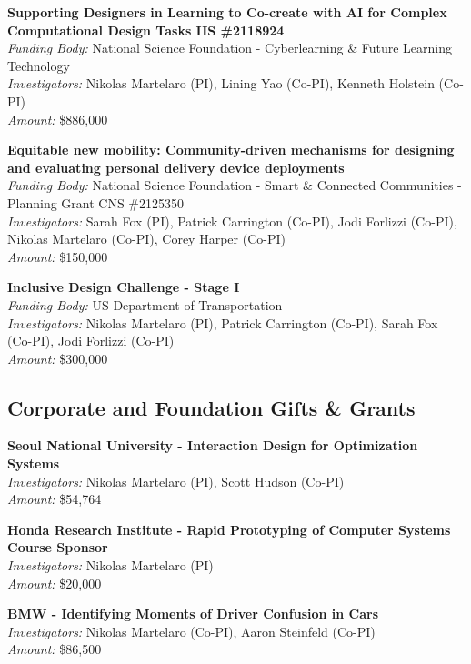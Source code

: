 \documentclass[11pt]{article} %
\begin{document}
\textbf{Supporting Designers in Learning to Co-create with AI for Complex Computational Design Tasks IIS \#2118924}\\
\textit{Funding Body:} National Science Foundation - Cyberlearning \& Future Learning Technology\\
\textit{Investigators:} Nikolas Martelaro (PI), Lining Yao (Co-PI), Kenneth Holstein (Co-PI)\\
\textit{Amount:} \$886,000
\medskip

\textbf{Equitable new mobility: Community-driven mechanisms for designing and evaluating personal delivery device deployments}\\
\textit{Funding Body:} National Science Foundation - Smart \& Connected Communities - Planning Grant CNS \#2125350\\
\textit{Investigators:} Sarah Fox (PI), Patrick  Carrington (Co-PI), Jodi Forlizzi (Co-PI), Nikolas Martelaro (Co-PI), Corey Harper (Co-PI)\\
\textit{Amount:} \$150,000
\medskip

 \textbf{Inclusive Design Challenge - Stage I}\\
\textit{Funding Body:} US Department of Transportation\\
\textit{Investigators:} Nikolas Martelaro (PI), Patrick Carrington (Co-PI), Sarah Fox (Co-PI), Jodi Forlizzi (Co-PI)\\
\textit{Amount:} \$300,000

\subsection*{Corporate and Foundation Gifts \& Grants}

 \textbf{Seoul National University - Interaction Design for Optimization Systems}\\
\textit{Investigators:} Nikolas Martelaro (PI), Scott Hudson (Co-PI)\\
\textit{Amount:} \$54,764  
\medskip

 \textbf{Honda Research Institute - Rapid Prototyping of Computer Systems Course Sponsor}\\
\textit{Investigators:} Nikolas Martelaro (PI)\\
\textit{Amount:} \$20,000  
\medskip

 \textbf{BMW - Identifying Moments of Driver Confusion in Cars}\\
\textit{Investigators:} Nikolas Martelaro (Co-PI), Aaron Steinfeld (Co-PI)\\
\textit{Amount:} \$86,500 
\medskip
\end{document}
